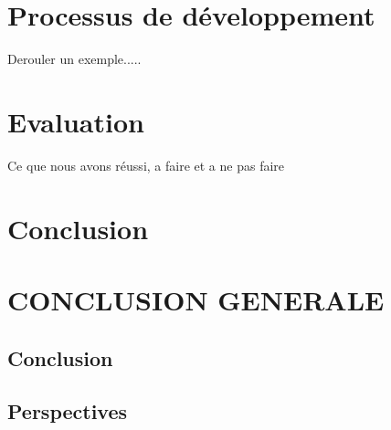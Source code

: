 \documentclass[
10pt, %
a4paper, %
oneside, %
headinclude,footinclude, %
BCOR5mm, %
]{report}
\begin{document}
		\section{Processus de développement}
		Derouler un exemple.....
		\section{Evaluation}
		Ce que nous avons réussi, a faire et a ne pas faire
		\section{Conclusion}
		\lipsum[10]	
										  
										  
										  
		\newpage
		\section{CONCLUSION GENERALE}
		\subsection{Conclusion}
		\lipsum[10]
		\subsection{Perspectives}
		\lipsum[10]
										  
										  
														  
																
		\newpage
		\listoffigures %
		\newpage
		\listoftables %
										  
\end{document}

